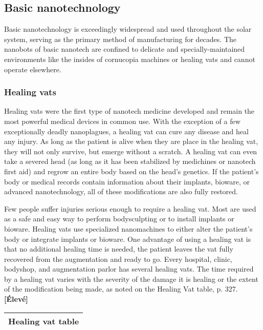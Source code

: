 {{\subsection{Basic nanotechnology} \label{sec:basic-nanotech} 

Basic nanotechnology is exceedingly widespread and used throughout the solar system, serving as the primary method of manufacturing for decades. The nanobots of basic nanotech are confined to delicate and specially-maintained environments like the insides of cornucopia machines or healing vats and cannot operate elsewhere. 

\subsubsection{Healing vats} 

Healing vats were the first type of nanotech medicine developed and remain the most powerful medical devices in common use. With the exception of a few exceptionally deadly nanoplagues, a healing vat can cure any disease and heal any injury. As long as the patient is alive when they are place in the healing vat, they will not only survive, but emerge without a scratch. A healing vat can even take a severed head (as long as it has been stabilized by medichines or nanotech first aid) and regrow an entire body based on the head’s genetics. If the patient’s body or medical records contain information about their implants, bioware, or advanced nanotechnology, all of these modifications are also fully restored. 

Few people suffer injuries serious enough to require a healing vat. Most are used as a safe and easy way to perform bodysculpting or to install implants or bioware. Healing vats use specialized nanomachines to either alter the patient’s body or integrate implants or bioware. One advantage of using a healing vat is that no additional healing time is needed, the patient leaves the vat fully recovered from the augmentation and ready to go. Every hospital, clinic, bodyshop, and augmentation parlor has several healing vats. The time required by a healing vat varies with the severity of the damage it is healing or the extent of the modification being made, as noted on the Healing Vat table, p. 327. \textbf{[Élevé]} 

\begin{table} \begin{tabularx}{\textwidth}{|X|X|} \hline

\multicolumn{2}{|c|}{Healing vat table} \\ \hline


\end{tabularx}
\end{table}}}
